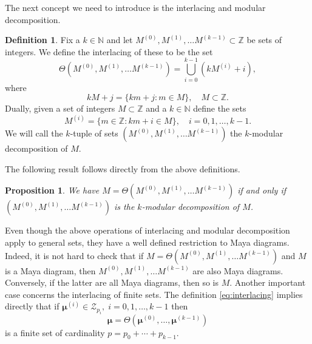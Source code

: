 \documentclass{amsart}
\newtheorem{proposition}{Proposition}
\theoremstyle{definition}
\newtheorem{definition}{Definition}
\newcommand{\N}{\mathbb{N}}
\newcommand{\Z}{\mathbb{Z}}
\newcommand{\bmu}{{\boldsymbol{\mu}}}
\newcommand{\cZ}{\mathcal{Z}}
\begin{document}
The next concept we need to introduce is the interlacing and modular
decomposition. 
\begin{definition}\label{def:interlacing}
  Fix a $k\in \N$ and let $M^{(0)}, M^{(1)},\ldots M^{(k-1)}\subset \Z$ be sets
  of integers.  We define the interlacing of these to be the set
  \begin{equation}\label{eq:interlacing} \Theta\left(M^{(0)}, M^{(1)},\ldots M^{(k-1)}\right)
    = \bigcup_{i=0}^{k-1} (k M^{(i)} +i),
 \end{equation}
 where
 \[ kM +j = \{ km + j \colon m\in M \},\quad M\subset \Z.\]
 Dually, given a set of integers $M\subset \Z$ and a $k\in \N$ define
 the sets
 \[ M^{(i)} = \{ m\in \Z \colon km+i \in M\},\quad i=0,1,\ldots, k-1.\]
 We will call the $k$-tuple of sets $\left(M^{(0)}, M^{(1)},\ldots M^{(k-1)}\right)$ the
 $k$-modular decomposition of $M$.
\end{definition}



The following result follows directly from the above definitions.
\begin{proposition}
  We have $M=\Theta\left(M^{(0)}, M^{(1)},\ldots M^{(k-1)}\right)$ if and only if
  $\left(M^{(0)}, M^{(1)},\ldots M^{(k-1)}\right)$ is the $k$-modular decomposition of $M$.
\end{proposition}

Even though the above operations of interlacing and modular
decomposition apply to general sets, they have a well defined
restriction to Maya diagrams.  Indeed, it is not hard to check that if
$M=\Theta\left(M^{(0)}, M^{(1)},\ldots M^{(k-1)}\right)$ and $M$ is a Maya diagram, then
 $M^{(0)}, M^{(1)},\ldots M^{(k-1)}$ are also Maya diagrams.  Conversely, if the latter are all Maya
diagrams, then so is $M$.  Another important case concerns the
interlacing of finite sets.  The definition \eqref{eq:interlacing}
implies directly that if $\bmu^{(i)} \in \cZ_{p_i},\; i=0,1,\ldots, k-1$
then
\[ \bmu = \Theta\left(\bmu^{(0)}, \ldots , \bmu^{(k-1)}\right) \]
is a finite set of cardinality $p=p_0+\cdots + p_{k-1}$.
\end{document}
